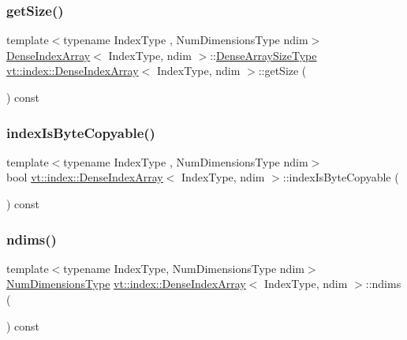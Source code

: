 \subsubsection{\texorpdfstring{get\+Size()}{getSize()}}
{\footnotesize\ttfamily template$<$typename Index\+Type , Num\+Dimensions\+Type ndim$>$ \\
\hyperlink{structvt_1_1index_1_1_dense_index_array}{Dense\+Index\+Array}$<$ Index\+Type, ndim $>$\+::\hyperlink{structvt_1_1index_1_1_dense_index_array_a7a66b5cd270377310119da3d0c884224}{Dense\+Array\+Size\+Type} \hyperlink{structvt_1_1index_1_1_dense_index_array}{vt\+::index\+::\+Dense\+Index\+Array}$<$ Index\+Type, ndim $>$\+::get\+Size (\begin{DoxyParamCaption}{ }\end{DoxyParamCaption}) const}

\mbox{\label{structvt_1_1index_1_1_dense_index_array_a2c47c2a4cb636879e03281d185e19fad}} 
\subsubsection{\texorpdfstring{index\+Is\+Byte\+Copyable()}{indexIsByteCopyable()}}
{\footnotesize\ttfamily template$<$typename Index\+Type , Num\+Dimensions\+Type ndim$>$ \\
bool \hyperlink{structvt_1_1index_1_1_dense_index_array}{vt\+::index\+::\+Dense\+Index\+Array}$<$ Index\+Type, ndim $>$\+::index\+Is\+Byte\+Copyable (\begin{DoxyParamCaption}{ }\end{DoxyParamCaption}) const}

\mbox{\label{structvt_1_1index_1_1_dense_index_array_acdd28d6484fd548fdd18609b2c7ff4fe}} 
\subsubsection{\texorpdfstring{ndims()}{ndims()}}
{\footnotesize\ttfamily template$<$typename Index\+Type, Num\+Dimensions\+Type ndim$>$ \\
\hyperlink{namespacevt_1_1index_a97aa9370711425850c86bcb7a20d73e8}{Num\+Dimensions\+Type} \hyperlink{structvt_1_1index_1_1_dense_index_array}{vt\+::index\+::\+Dense\+Index\+Array}$<$ Index\+Type, ndim $>$\+::ndims (\begin{DoxyParamCaption}{ }\end{DoxyParamCaption}) const\hspace{0.3cm}{\ttfamily [inline]}}


